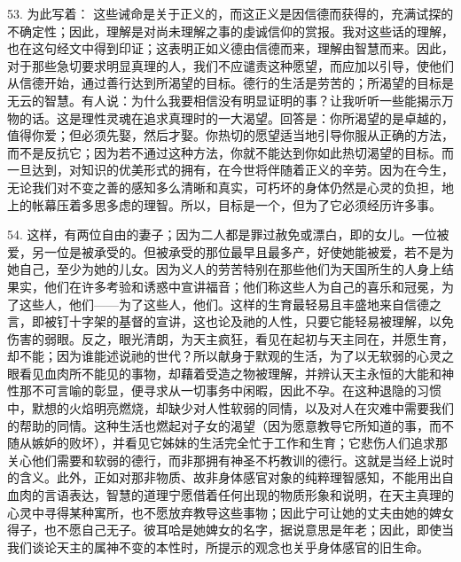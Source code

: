 53. 为此写着：  这些诫命是关于正义的，而这正义是因信德而获得的，充满试探的不确定性；因此，理解是对尚未理解之事的虔诚信仰的赏报。我对这些话的理解，也在这句经文中得到印证；这表明正如义德由信德而来，理解由智慧而来。因此，对于那些急切要求明显真理的人，我们不应谴责这种愿望，而应加以引导，使他们从信德开始，通过善行达到所渴望的目标。德行的生活是劳苦的；所渴望的目标是无云的智慧。有人说：为什么我要相信没有明显证明的事？让我听听一些能揭示万物的话。这是理性灵魂在追求真理时的一大渴望。回答是：你所渴望的是卓越的，值得你爱；但必须先娶，然后才娶。你热切的愿望适当地引导你服从正确的方法，而不是反抗它；因为若不通过这种方法，你就不能达到你如此热切渴望的目标。而一旦达到，对知识的优美形式的拥有，在今世将伴随着正义的辛劳。因为在今生，无论我们对不变之善的感知多么清晰和真实，可朽坏的身体仍然是心灵的负担，地上的帐幕压着多思多虑的理智。所以，目标是一个，但为了它必须经历许多事。\par

54. 这样，\newline{}有两位自由的妻子；因为二人都是罪过赦免或漂白，即\newline{}的女儿。一位被爱，另一位是被承受的。但被承受的那位最早且最多产，好使她能被爱，若不是为她自己，至少为她的儿女。因为义人的劳苦特别在那些他们为天国所生的人身上结果实，他们在许多考验和诱惑中宣讲福音；他们称这些人为自己的喜乐和冠冕，为了这些人，他们——为了这些人，他们。这样的生育最轻易且丰盛地来自信德之言，即被钉十字架的基督的宣讲，这也论及祂的人性，只要它能轻易被理解，以免伤害\newline{}的弱眼。反之，\newline{}眼光清朗，为天主疯狂，看见在起初\newline{}与天主同在，并愿生育，却不能；因为谁能述说祂的世代？所以献身于默观的生活，为了以无软弱的心灵之眼看见血肉所不能见的事物，却藉着受造之物被理解，并辨认天主永恒的大能和神性那不可言喻的彰显，便寻求从一切事务中闲暇，因此不孕。在这种退隐的习惯中，默想的火焰明亮燃烧，却缺少对人性软弱的同情，以及对人在灾难中需要我们的帮助的同情。这种生活也燃起对子女的渴望（因为愿意教导它所知道的事，而不随从嫉妒的败坏），并看见它姊妹的生活完全忙于工作和生育；它悲伤人们追求那关心他们需要和软弱的德行，而非那拥有神圣不朽教训的德行。这就是当经上说\newline{}时的含义。此外，正如对那非物质、故非身体感官对象的纯粹理智感知，不能用出自血肉的言语表达，智慧的道理宁愿借着任何出现的物质形象和说明，在天主真理的心灵中寻得某种寓所，也不愿放弃教导这些事物；因此\newline{}宁可让她的丈夫由她的婢女得子，也不愿自己无子。彼耳哈是她婢女的名字，据说意思是年老；因此，即使当我们谈论天主的属神不变的本性时，所提示的观念也关乎身体感官的旧生命。\par


